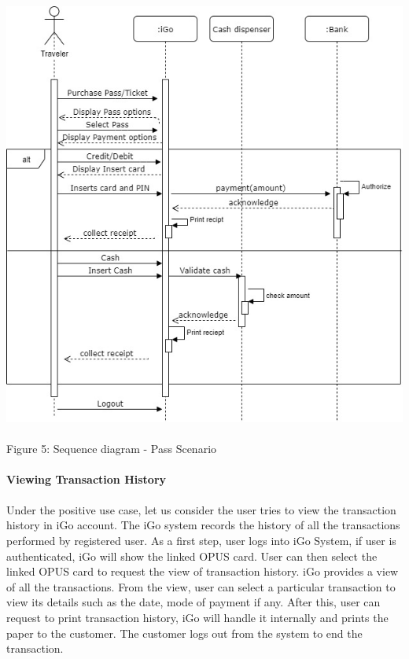 \documentclass[a4paper, 11pt]{report}
\begin{document}
{ \includegraphics[width=150mm,height=150mm,scale=0.5]
{SequenceDiagram_Pass.jpg}\\
\tab\tab\qquad\qquad\qquad\qquad
Figure 5: Sequence diagram - Pass Scenario \\\\
\large{\textbf{Viewing Transaction History}}\\\\
Under the positive use case, let us consider the user tries to view the transaction history in iGo account. The iGo system records the history of all the transactions performed by registered user. As a first step, user logs into iGo System, if user is authenticated, iGo will show the linked OPUS card. User can then select the linked OPUS card to request the view of transaction history. iGo provides a view of all the transactions. From the view, user can select a particular transaction to view its details such as the date, mode of payment if any. After this, user can request to print transaction history, iGo will handle it internally and prints the paper to the customer. The customer logs out from the system to end the transaction.\\\\

}
\end{document}
